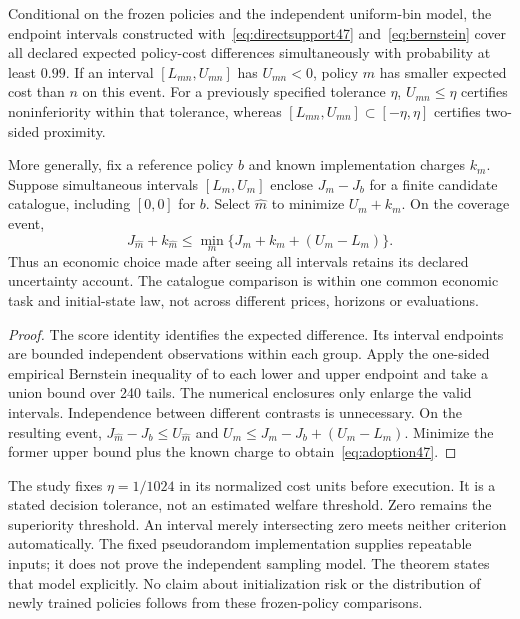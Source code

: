 \begin{theorem}\label{thm:adoption47}
Conditional on the frozen policies and the independent uniform-bin model, the endpoint intervals constructed with~\eqref{eq:directsupport47} and~\eqref{eq:bernstein} cover all declared expected policy-cost differences simultaneously with probability at least $0.99$. If an interval $[L_{mn},U_{mn}]$ has $U_{mn}<0$, policy $m$ has smaller expected cost than $n$ on this event. For a previously specified tolerance $\eta$, $U_{mn}\le\eta$ certifies noninferiority within that tolerance, whereas $[L_{mn},U_{mn}]\subset[-\eta,\eta]$ certifies two-sided proximity.

More generally, fix a reference policy $b$ and known implementation charges $k_m$. Suppose simultaneous intervals $[L_m,U_m]$ enclose $J_m-J_b$ for a finite candidate catalogue, including $[0,0]$ for $b$. Select $\widehat m$ to minimize $U_m+k_m$. On the coverage event,
\begin{equation}\label{eq:adoption47}
 J_{\widehat m}+k_{\widehat m}
 \le \min_m\{J_m+k_m+(U_m-L_m)\}.
\end{equation}
Thus an economic choice made after seeing all intervals retains its declared uncertainty account. The catalogue comparison is within one common economic task and initial-state law, not across different prices, horizons or evaluations.
\end{theorem}
\begin{proof}
The score identity identifies the expected difference. Its interval endpoints are bounded independent observations within each group. Apply the one-sided empirical Bernstein inequality of \citet{maurer2009} to each lower and upper endpoint and take a union bound over 240 tails. The numerical enclosures only enlarge the valid intervals. Independence between different contrasts is unnecessary. On the resulting event, $J_{\widehat m}-J_b\le U_{\widehat m}$ and $U_m\le J_m-J_b+(U_m-L_m)$. Minimize the former upper bound plus the known charge to obtain~\eqref{eq:adoption47}.
\end{proof}

The study fixes $\eta=1/1024$ in its normalized cost units before execution. It is a stated decision tolerance, not an estimated welfare threshold. Zero remains the superiority threshold. An interval merely intersecting zero meets neither criterion automatically. The fixed pseudorandom implementation supplies repeatable inputs; it does not prove the independent sampling model. The theorem states that model explicitly. No claim about initialization risk or the distribution of newly trained policies follows from these frozen-policy comparisons.

